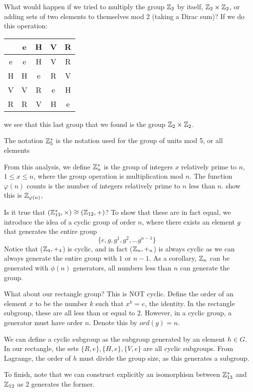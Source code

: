 \documentclass[11pt,twosided]{article}
\begin{document}
What would happen if we tried to multiply the group $\mathbb Z_2$ by itself, $\mathbb Z_2 \times \mathbb Z_2$, or adding sets of two elements to themselves mod 2 (taking a Dirac sum)? If we do this operation: 
\begin{center}
\begin{tabular}{c | c c c c}
 & e & H & V & R \\ \hline 
e & e & H & V & R \\ 
H & H & e & R & V\\ 
V & V & R & e & H \\ 
R & R & V & H & e \\ 
\end{tabular}
\end{center}
we see that this last group that we found is the group $\mathbb Z_2 \times \mathbb Z_2$. 

The notation $\mathbb Z_5^*$ is the notation used for the group of units mod 5, or all elements 

From this analysis, we define $\mathbb Z_n^*$ is the group of integers $x$ relatively prime to $n$, $1 \leq x \leq n$, where the group operation is multiplication mod $n$. The function $\varphi(n)$ counts is the number of integers relatively prime to $n$ less than $n$.  show this is $\mathbb Z_{\varphi(n)}$,

Is it true that $( \mathbb Z_{13}^*, \times) \cong ( \mathbb Z_{12}, +)$? To show that these are in fact equal, we introduce the idea of a cyclic group of order $n$, where there exists an element $g$ that generates the entire group 
\[
	\{e, g, g^1, g^2, \ldots g^{n-1} \}
\]
Notice that ($\mathbb Z_4, +_4$) is cyclic, and in fact ($\mathbb Z_n, +_n$) is always cyclic as we can always generate the entire group with $1$ or $n-1$. As a corollary, $\mathbb Z_n$ can be generated with $\phi(n)$ generators, all numbers less than $n$ can generate the group. 

What about our rectangle group? This is NOT cyclic. Define the order of an element $x$ to be the number $k$ such that $x^k = e$, the identity. In the rectangle subgroup, these are all less than or equal to 2. However, in a cyclic group, a generator must have order $n$. Denote this by $ord(g) = n$. 

We can define a cyclic subgroup as the subgroup generated by an element $h \in G$. In our rectangle, the sets $\{R, e\}, \{H, e\}, \{V, e\}$ are all cyclic subgroups. From Lagrange, the order of $h$ must divide the group size, as this generates a subgroup. 

To finish, note that we can construct explicitly an isomorphism between $\mathbb Z_{13}^*$ and $\mathbb Z_{12}$ as 2 generates the former.
\end{document}
